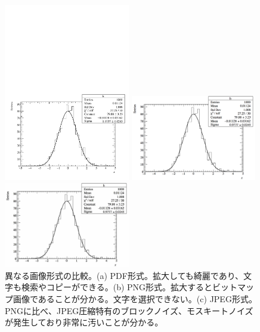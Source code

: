 \begin{figure}
  \begin{minipage}[b]{.3333\linewidth}
    \centering
    \includegraphics[width=5.5cm]{fig/histogram.pdf}
  \end{minipage}%
  \begin{minipage}[b]{.3333\linewidth}
    \centering
    \includegraphics[width=5.5cm]{fig/histogram.png}
  \end{minipage}%
  \begin{minipage}[b]{.3333\linewidth}
    \centering
    \includegraphics[width=5.5cm]{fig/histogram.jpg}
  \end{minipage}
  \caption[異なる画像形式の比較]{異なる画像形式の比較。(a) PDF形式。拡大しても綺麗であり、文字も検索やコピーができる。(b) PNG形式。拡大するとビットマップ画像であることが分かる。文字を選択できない。(c) JPEG形式。PNGに比べ、JPEG圧縮特有のブロックノイズ、モスキートノイズが発生しており非常に汚いことが分かる。}
  \label{fig_formats}
\end{figure}


